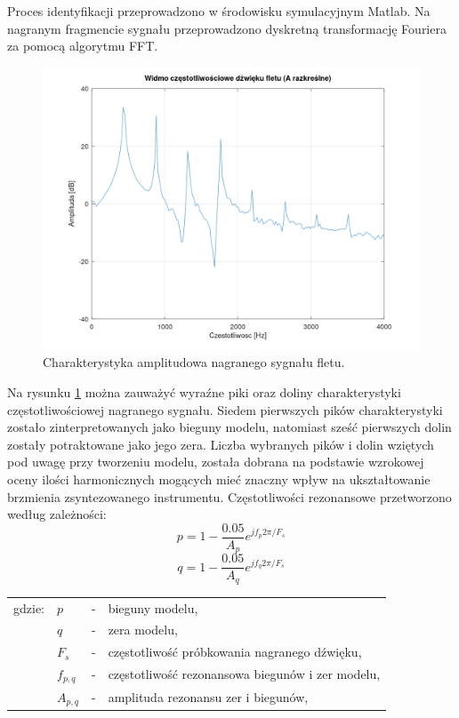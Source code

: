 Proces identyfikacji przeprowadzono w środowisku symulacyjnym Matlab. Na nagranym fragmencie sygnału przeprowadzono dyskretną transformację Fouriera za pomocą algorytmu FFT.

\begin{figure}[H]
	\centering
	\includegraphics[width=12cm]{grafiki/flute_spectrum_orig}
	\captionsetup{justification=centering}
	\caption{Charakterystyka amplitudowa nagranego sygnału fletu.}
	\label{rys:flute_spectrum}
\end{figure}

Na rysunku \ref{rys:flute_spectrum} można zauważyć wyraźne piki oraz doliny charakterystyki częstotliwościowej nagranego sygnału. Siedem pierwszych pików charakterystyki zostało zinterpretowanych jako bieguny modelu, natomiast sześć pierwszych dolin zostały potraktowane jako jego zera. Liczba wybranych pików i dolin wziętych pod uwagę przy tworzeniu modelu, została dobrana na podstawie wzrokowej oceny ilości harmonicznych mogących mieć znaczny wpływ na ukształtowanie brzmienia zsyntezowanego instrumentu. Częstotliwości rezonansowe przetworzono według zależności:
\begin{equation} \label{equ:flute_bieguny}
p = 1-\frac{0.05}{A_{p}}e^{jf_{p}2\pi/F_{s}}
\end{equation}
\begin{equation} \label{equ:flute_doliny}
q = 1-\frac{0.05}{A_{q}}e^{jf_{q}2\pi/F_{s}}
\end{equation}
\begin{tabular}{ l l l l}
	gdzie: & $p$ &  - & bieguny modelu, \\
	&	$q$ & - &  zera modelu, \\
	&	$F_{s}$ & - &  częstotliwość próbkowania nagranego dźwięku,\\
	&	$f_{p,q}$ & - &  częstotliwość rezonansowa biegunów i zer modelu, \\
	&	$A_{p,q}$ & - &  amplituda rezonansu zer i biegunów, \\
\end{tabular} \\

